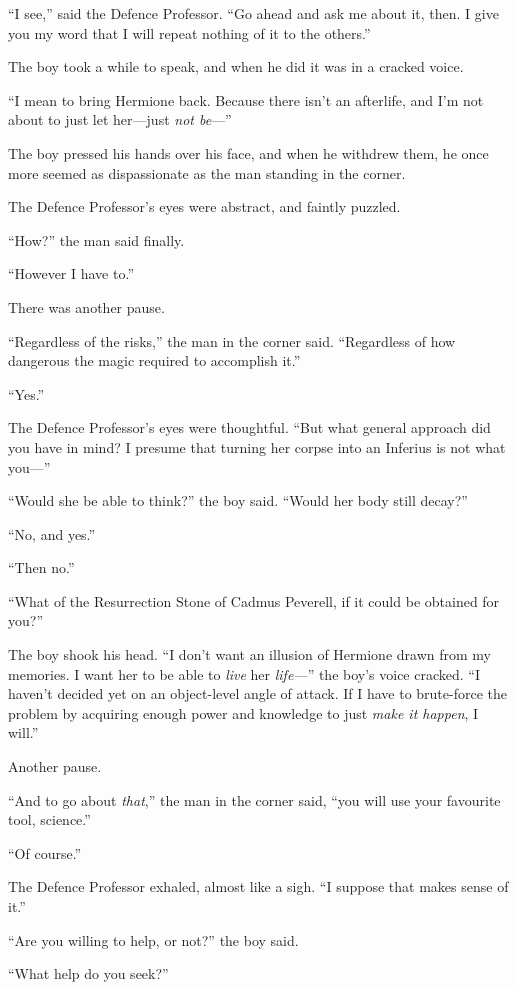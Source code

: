 “I see,” said the Defence Professor. “Go ahead and ask me about it, then. I give you my word that I will repeat nothing of it to the others.”

The boy took a while to speak, and when he did it was in a cracked voice.

“I mean to bring Hermione back. Because there isn’t an afterlife, and I’m not about to just let her—just \emph{not be}—”

The boy pressed his hands over his face, and when he withdrew them, he once more seemed as dispassionate as the man standing in the corner.

The Defence Professor’s eyes were abstract, and faintly puzzled.

“How?” the man said finally.

“However I have to.”

There was another pause.

“Regardless of the risks,” the man in the corner said. “Regardless of how dangerous the magic required to accomplish it.”

“Yes.”

The Defence Professor’s eyes were thoughtful. “But what general approach did you have in mind? I presume that turning her corpse into an Inferius is not what you—”

“Would she be able to think?” the boy said. “Would her body still decay?”

“No, and yes.”

“Then no.”

“What of the Resurrection Stone of Cadmus Peverell, if it could be obtained for you?”

The boy shook his head. “I don’t want an illusion of Hermione drawn from my memories. I want her to be able to \emph{live} her \emph{life—}” the boy’s voice cracked. “I haven’t decided yet on an object-level angle of attack. If I have to brute-force the problem by acquiring enough power and knowledge to just \emph{make it happen}, I will.”

Another pause.

“And to go about \emph{that},” the man in the corner said, “you will use your favourite tool, science.”

“Of course.”

The Defence Professor exhaled, almost like a sigh. “I suppose that makes sense of it.”

“Are you willing to help, or not?” the boy said.

“What help do you seek?”

